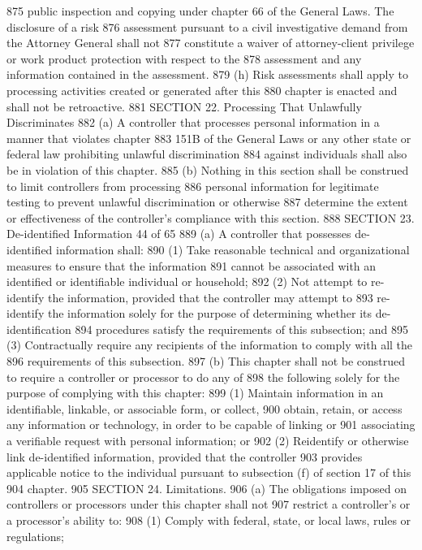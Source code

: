 875 public inspection and copying under chapter 66 of the General Laws. The disclosure of a risk
876 assessment pursuant to a civil investigative demand from the Attorney General shall not
877 constitute a waiver of attorney-client privilege or work product protection with respect to the
878 assessment and any information contained in the assessment.
879 (h) Risk assessments shall apply to processing activities created or generated after this
880 chapter is enacted and shall not be retroactive.
881 SECTION 22. Processing That Unlawfully Discriminates
882 (a) A controller that processes personal information in a manner that violates chapter
883 151B of the General Laws or any other state or federal law prohibiting unlawful discrimination
884 against individuals shall also be in violation of this chapter.
885 (b) Nothing in this section shall be construed to limit controllers from processing
886 personal information for legitimate testing to prevent unlawful discrimination or otherwise
887 determine the extent or effectiveness of the controller’s compliance with this section.
888 SECTION 23. De-identified Information
44 of 65
889 (a) A controller that possesses de-identified information shall:
890 (1) Take reasonable technical and organizational measures to ensure that the information
891 cannot be associated with an identified or identifiable individual or household;
892 (2) Not attempt to re-identify the information, provided that the controller may attempt to
893 re-identify the information solely for the purpose of determining whether its de-identification
894 procedures satisfy the requirements of this subsection; and
895 (3) Contractually require any recipients of the information to comply with all the
896 requirements of this subsection.
897 (b) This chapter shall not be construed to require a controller or processor to do any of
898 the following solely for the purpose of complying with this chapter:
899 (1) Maintain information in an identifiable, linkable, or associable form, or collect,
900 obtain, retain, or access any information or technology, in order to be capable of linking or
901 associating a verifiable request with personal information; or
902 (2) Reidentify or otherwise link de-identified information, provided that the controller
903 provides applicable notice to the individual pursuant to subsection (f) of section 17 of this
904 chapter.
905 SECTION 24. Limitations.
906 (a) The obligations imposed on controllers or processors under this chapter shall not
907 restrict a controller’s or a processor’s ability to:
908 (1) Comply with federal, state, or local laws, rules or regulations;
